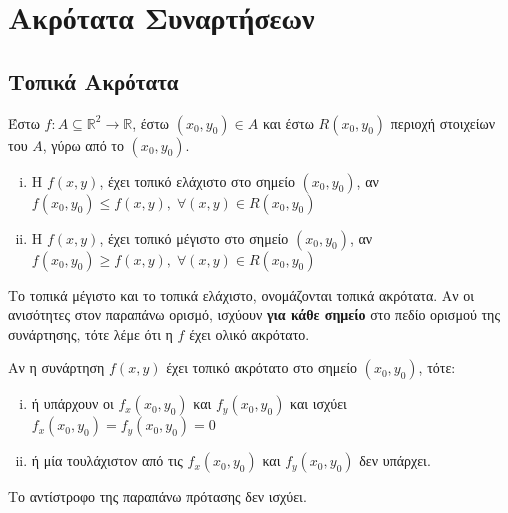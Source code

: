 \documentclass[a4paper,table]{report}
\begin{document}
\chapter{Ακρότατα Συναρτήσεων}

\section{Τοπικά Ακρότατα}

\begin{mybox1}
\begin{dfn}
\item {}
  Έστω $ f \colon A \subseteq \mathbb{R}^{2} \to \mathbb{R} $, έστω 
  $ (x_{0}, y_{0}) \in A $ και έστω $R(x_{0}, y_{0}) $ περιοχή στοιχείων του $A$, 
  γύρω από το $ (x_{0}, y_{0}) $.
  \begin{enumerate}[i)]
    \item 
      Η $ f(x,y) $, έχει τοπικό ελάχιστο στο σημείο $ (x_{0}, y_{0}) $, αν 
      $ f(x_{0}, y_{0}) \leq f(x,y), \; \forall (x,y) \in R(x_{0}, y_{0}) $ 
    \item 
      Η $ f(x,y) $, έχει τοπικό μέγιστο στο σημείο $ (x_{0}, y_{0}) $, αν 
      $ f(x_{0}, y_{0}) \geq f(x,y), \; \forall (x,y) \in R(x_{0}, y_{0}) $ 
  \end{enumerate}
  Το τοπικά μέγιστο και το τοπικά ελάχιστο, ονομάζονται \textcolor{Col1}{τοπικά
  ακρότατα}. 
  Αν οι ανισότητες στον παραπάνω ορισμό, ισχύουν \textbf{για κάθε σημείο} στο πεδίο 
  ορισμού της συνάρτησης, τότε λέμε ότι η $f$ έχει \textcolor{Col1}{ολικό ακρότατο}.
\end{dfn}
\end{mybox1}

\begin{prop}\label{prop:fermat2}
\item {}
  Αν η συνάρτηση $ f(x,y) $ έχει τοπικό ακρότατο στο σημείο $ (x_{0}, y_{0}) $, 
  τότε:
  \begin{enumerate}[i)]
    \item ή υπάρχουν οι $ f_{x}(x_{0}, y_{0}) $ και $ f_{y}(x_{0}, y_{0}) $ 
      και ισχύει $ f_{x}(x_{0}, y_{0}) = f_{y}(x_{0}, y_{0} )=0 $
    \item ή μία τουλάχιστον από τις $ f_{x}(x_{0}, y_{0}) $ και 
      $ f_{y}(x_{0}, y_{0}) $ δεν υπάρχει.
  \end{enumerate}
\end{prop}

\begin{rem}
\item {}
  Το αντίστροφο της παραπάνω πρότασης δεν ισχύει. 
\end{rem}
\end{document}

